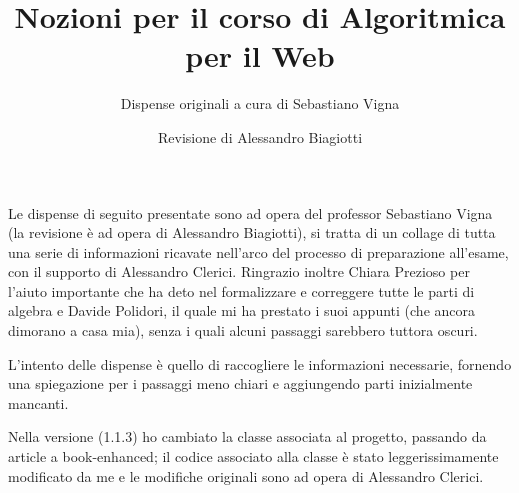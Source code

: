 \documentclass[a4paper]{book-enhanced}
\title{Nozioni per il corso di Algoritmica per il Web}
\subtitle{Dispense originali a cura di Sebastiano Vigna}
\author{Revisione di Alessandro Biagiotti}
\begin{document}
\maketitle
\noindent Le dispense di seguito presentate sono ad opera del professor Sebastiano Vigna (la
revisione è ad opera di Alessandro Biagiotti), si tratta di un collage di tutta una serie di
informazioni ricavate nell'arco del processo di preparazione all'esame, con il supporto di
Alessandro Clerici. Ringrazio inoltre Chiara Prezioso per l'aiuto importante che ha deto nel formalizzare e correggere tutte le parti di algebra e Davide Polidori, il quale mi ha prestato i suoi appunti (che ancora dimorano a casa mia), senza i quali alcuni passaggi sarebbero tuttora oscuri.

L'intento delle dispense è quello di raccogliere le informazioni necessarie, fornendo una spiegazione per i passaggi meno chiari e aggiungendo parti inizialmente mancanti.

Nella versione (1.1.3) ho cambiato la classe associata al progetto, passando da article a book-enhanced; il codice associato alla classe è stato leggerissimamente modificato da me e le modifiche originali sono ad opera di Alessandro Clerici.

\tableofcontents
\clearpage



\end{document}
